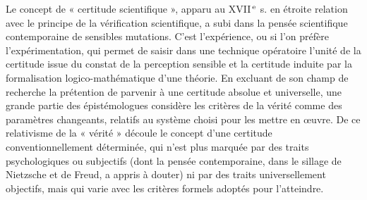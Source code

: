 Le concept de « certitude scientifique »,
apparu au {\footnotesize XVII}$^\text{\,e}$ s.
en étroite relation avec le
principe de la vérification scientifique, a
subi dans la pensée scientifique contemporaine
de sensibles mutations. C’est l’expérience,
ou si l’on préfère l’expérimentation,
qui permet de saisir dans une technique
opératoire l’unité de la certitude issue du
constat de la perception sensible et la certitude
induite par la formalisation logico-mathématique
d’une théorie. En excluant
de son champ de recherche la prétention de
parvenir à une certitude absolue et universelle,
une grande partie des épistémologues
considère les critères de la vérité comme
des paramètres changeants, relatifs au système
choisi pour les mettre en œuvre. De
ce relativisme de la « vérité » découle le
concept d’une certitude conventionnellement
déterminée, qui n’est plus marquée
par des traits psychologiques ou subjectifs
(dont la pensée contemporaine, dans le sillage
de Nietzsche et de Freud, a appris à
douter) ni par des traits universellement
objectifs, mais qui varie avec les critères
formels adoptés pour l’atteindre.


 

